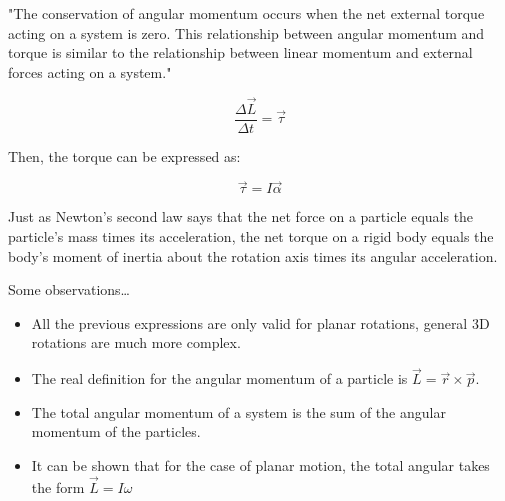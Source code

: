 \documentclass[]{beamer}
\begin{document}


\begin{frame}


  "The conservation of angular momentum occurs when the net external torque acting on a system is zero. 
  This relationship between angular momentum and torque is similar to the relationship between 
  linear momentum and external forces acting on a system."


\pause
\vspace*{3mm}

\begin{equation}
  \frac{\Delta \vec{L}}{\Delta t}=\vec{\tau}
\end{equation}


  
  \end{frame}

\begin{frame}

Then, the torque can be expressed as:
\pause
\vspace*{7mm}

\begin{equation}
  \vec{\tau }= I\vec{\alpha}
\end{equation}

\pause
\vspace*{7mm}

  Just as Newton’s second law says that the net force on a particle equals the particle’s
  mass times its acceleration, the net torque on a rigid body equals
  the body’s moment of inertia about the rotation axis times its angular acceleration.
  
  \end{frame}

\begin{frame}
Some observations\dots

\vspace*{7mm}
\pause

\begin{itemize}
    \item All the previous expressions are only valid for planar rotations, 
    general 3D rotations are much more complex.
    \item The real definition for the angular momentum of a particle is $\vec{L}=\vec{r}\times\vec{p}$.
    \item The total angular momentum of a system is the sum of the angular momentum of the particles.
    \item It can be shown that for the case of planar motion, the total angular takes the form $\vec{L}=I \omega$ 
  \end{itemize}
\end{frame}
\end{document}
